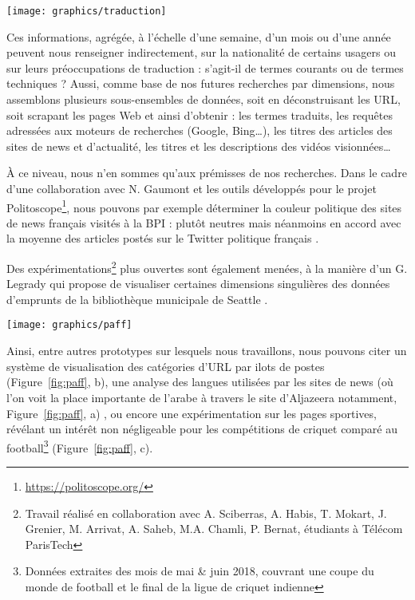 \documentclass[symmetric,justified,marginals=raggedouter]{tufte-book}
\begin{document}
\begin{figure*}
  \texttt{[image: graphics/traduction]}
  \caption{Exemple d'url du site de traduction linguee, pour le mot mémoire, du français vers l'anglais}
  \label{fig:traduction}
\end{figure*} 

\noindent Ces informations, agrégée, à l'échelle d'une semaine, d'un mois ou d'une année peuvent nous renseigner indirectement, sur la nationalité de certains usagers ou sur leurs préoccupations de traduction : s'agit-il de termes courants ou de termes techniques ? Aussi, comme base de nos futures recherches par dimensions, nous assemblons plusieurs sous-ensembles de données, soit en déconstruisant les URL, soit scrapant les pages Web et ainsi d'obtenir : les termes traduits, les requêtes adressées aux moteurs de recherches (Google, Bing\ldots{}), les titres des articles des sites de news et d'actualité, les titres et les descriptions des vidéos visionnées\ldots{}

À ce niveau, nous n'en sommes qu'aux prémisses de nos recherches. Dans le cadre d'une collaboration avec N. Gaumont et les outils développés pour le projet Politoscope\footnote{\RaggedOuter \url{https://politoscope.org/}}, nous pouvons par exemple déterminer la couleur politique des sites de news français visités à la BPI : plutôt neutres mais néanmoins en accord avec la moyenne des articles postés sur le Twitter politique français \citep{gaumont_methods_2017}. 

Des expérimentations\footnote{\RaggedOuter Travail réalisé en collaboration avec A. Sciberras, A. Habis, T. Mokart, J. Grenier, M. Arrivat, A. Saheb, M.A. Chamli, P. Bernat, étudiants à Télécom ParisTech} plus ouvertes sont également menées, à la manière d'un G. Legrady qui propose de visualiser certaines dimensions singulières des données d'emprunts de la bibliothèque municipale de Seattle \citep{legrady_making_2005}.

\begin{figure*}
  \texttt{[image: graphics/paff]}
  \caption{Prototypes de systèmes de visualisations, basés sur des dimensions particulières des logs de la BPI}
  \label{fig:paff}
\end{figure*}

\noindent Ainsi, entre autres prototypes sur lesquels nous travaillons, nous pouvons citer un système de visualisation des catégories d'URL par ilots de postes (Figure~\ref{fig:paff}, b), une analyse des langues utilisées par les sites de news (où l'on voit la place importante de l'arabe à travers le site d'Aljazeera notamment, Figure~\ref{fig:paff}, a) , ou encore une expérimentation sur les pages sportives, révélant un intérêt non négligeable pour les compétitions de criquet comparé au football\footnote{\RaggedOuter Données extraites des mois de mai \& juin 2018, couvrant une coupe du monde de football et le final de la ligue de criquet indienne} (Figure~\ref{fig:paff}, c).
\end{document}
